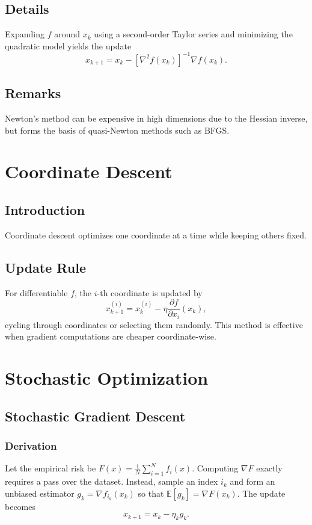 \documentclass[11pt]{book}
\begin{document}
\subsection{Details}
Expanding $f$ around $x_k$ using a second-order Taylor series and minimizing the quadratic model yields the update
\begin{equation}
x_{k+1}=x_k-\left[\nabla^2 f(x_k)\right]^{-1}\nabla f(x_k).
\end{equation}
\subsection{Remarks}
Newton's method can be expensive in high dimensions due to the Hessian inverse, but forms the basis of quasi-Newton methods such as BFGS.

\section{Coordinate Descent}
\subsection{Introduction}
Coordinate descent optimizes one coordinate at a time while keeping others fixed.
\subsection{Update Rule}
For differentiable $f$, the $i$-th coordinate is updated by
\begin{equation}
x_{k+1}^{(i)} = x_k^{(i)} - \eta \frac{\partial f}{\partial x_i}(x_k),
\end{equation}
cycling through coordinates or selecting them randomly. This method is effective when gradient computations are cheaper coordinate-wise.

\section{Stochastic Optimization}
\subsection{Stochastic Gradient Descent}
\subsubsection{Derivation}
Let the empirical risk be $F(x)=\frac{1}{N}\sum_{i=1}^N f_i(x)$. Computing $\nabla F$ exactly requires a pass over the dataset. Instead, sample an index $i_k$ and form an unbiased estimator $g_k=\nabla f_{i_k}(x_k)$ so that $\mathbb{E}[g_k]=\nabla F(x_k)$. The update becomes
\begin{equation}
x_{k+1}=x_k-\eta_k g_k.
\end{equation}
\end{document}
